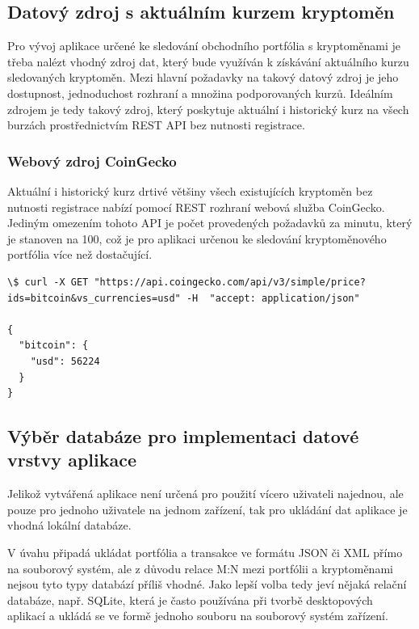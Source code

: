 \documentclass[12pt, a4paper]{article}
\begin{document}
    \subsection{Datový zdroj s aktuálním kurzem kryptoměn}

    Pro vývoj aplikace určené ke sledování obchodního portfólia s kryptoměnami je třeba nalézt vhodný zdroj dat, který bude využíván k získávání aktuálního kurzu sledovaných kryptoměn. Mezi hlavní požadavky na takový datový zdroj je jeho dostupnost, jednoduchost rozhraní a množina podporovaných kurzů. Ideálním zdrojem je tedy takový zdroj, který poskytuje aktuální i historický kurz na všech burzách prostřednictvím REST API bez nutnosti registrace.

    \subsubsection{Webový zdroj CoinGecko}
    Aktuální i historický kurz drtivé většiny všech existujících kryptoměn bez nutnosti registrace nabízí pomocí REST rozhraní webová služba CoinGecko\cite{coingecko2021}. Jediným omezením tohoto API je počet provedených požadavků za minutu, který je stanoven na 100, což je pro aplikaci určenou ke sledování kryptoměnového portfólia více než dostačující.

    \begin{lstlisting}
\$ curl -X GET "https://api.coingecko.com/api/v3/simple/price?ids=bitcoin&vs_currencies=usd" -H  "accept: application/json"

{
  "bitcoin": {
    "usd": 56224
  }
}
    \end{lstlisting}

    \subsection{Výběr databáze pro implementaci datové vrstvy aplikace}

    Jelikož vytvářená aplikace není určená pro použití vícero uživateli najednou, ale pouze pro jednoho uživatele na jednom zařízení, tak pro ukládání dat aplikace je vhodná lokální databáze.

    V úvahu připadá ukládat portfólia a transakce ve formátu JSON či XML přímo na souborový systém, ale z důvodu relace M:N mezi portfólii a kryptoměnami nejsou tyto typy databází příliš vhodné. Jako lepší volba tedy jeví nějaká relační databáze, např. SQLite, která je často používána při tvorbě desktopových aplikací a ukládá se ve formě jednoho souboru na souborový systém zařízení.
    
\end{document}
